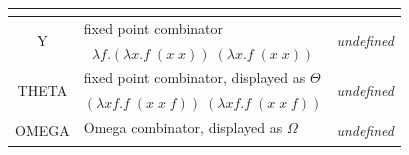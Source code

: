 \documentclass[table, a4paper, 10pt]{book}
\begin{document}
\begin{table}[H]
\begin{tabular}{cclcl}
\multicolumn{1}{|c|}{}                        & \multicolumn{2}{c|}{}                                                                                                                       & \multicolumn{1}{c|}{}                   & \multicolumn{1}{l|}{}                                                                                                                                             \\ \hline
\multicolumn{1}{|c|}{\multirow{2}{*}{Y}}      & \multicolumn{2}{l|}{fixed point combinator}                                                                                                 & \multicolumn{2}{c|}{\multirow{2}{*}{\textit{undefined}}}                                                                                                                                                    \\ \cline{2-3}
\multicolumn{1}{|c|}{}                        & \multicolumn{2}{c|}{$\lambda f.(\lambda x.f\;(x\;x))\;(\lambda x.f\;(x\;x))$}                                                               & \multicolumn{2}{c|}{}                                                                                                                                                                                       \\ \hline
\multicolumn{1}{|c|}{\multirow{2}{*}{THETA}}  & \multicolumn{2}{l|}{fixed point combinator, displayed  as $\Theta$}                                                                         & \multicolumn{2}{c|}{\multirow{2}{*}{\textit{undefined}}}                                                                                                                                                    \\ \cline{2-3}
\multicolumn{1}{|c|}{}                        & \multicolumn{2}{c|}{$(\lambda xf.f\;(x\;x\;f))\;(\lambda xf.f\;(x\;x\;f))$}                                                                 & \multicolumn{2}{c|}{}                                                                                                                                                                                       \\ \hline
\multicolumn{1}{|c|}{\multirow{2}{*}{OMEGA}}  & \multicolumn{2}{l|}{Omega combinator, displayed as $\Omega$}                                                                                & \multicolumn{2}{c|}{\multirow{2}{*}{\textit{undefined}}}                                                                                                                                                    \\ \cline{2-3}

\end{tabular}
\end{table}
\end{document}
